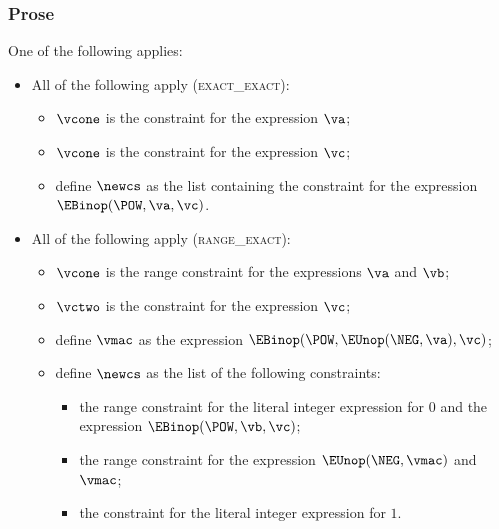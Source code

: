\subsubsection{Prose}
One of the following applies:
\begin{itemize}
  \item All of the following apply (\textsc{exact\_exact}):
  \begin{itemize}
    \item $\vcone$ is the constraint for the expression $\va$;
    \item $\vcone$ is the constraint for the expression $\vc$;
    \item define $\newcs$ as the list containing the constraint
    for the expression \\ $\EBinop(\POW, \va, \vc)$.
  \end{itemize}

  \item All of the following apply (\textsc{range\_exact}):
  \begin{itemize}
    \item $\vcone$ is the range constraint for the expressions $\va$ and $\vb$;
    \item $\vctwo$ is the constraint for the expression $\vc$;
    \item define $\vmac$ as the expression $\EBinop(\POW, \EUnop(\NEG, \va), \vc)$;
    \item define $\newcs$ as the list of the following constraints:
    \begin{itemize}
      \item the range constraint for the literal integer expression for $0$ and the expression
            $\EBinop(\POW, \vb, \vc)$;
      \item the range constraint for the expression $\EUnop(\NEG, \vmac)$ and $\vmac$;
      \item the constraint for the literal integer expression for $1$.
    \end{itemize}
  \end{itemize}


\end{itemize}
